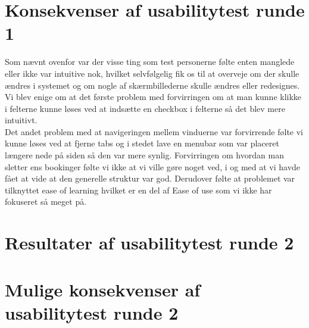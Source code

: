\section{Konsekvenser af usabilitytest runde 1}
Som nævnt ovenfor var der visse ting som test personerne følte enten manglede eller ikke var intuitive nok, hvilket selvfølgelig fik os til at overveje om der skulle ændres i systemet og om nogle af skærmbillederne skulle ændres eller redesignes. \\Vi blev enige om at det første problem med forvirringen om at man kunne klikke i felterne kunne løses ved at indsætte en checkbox i felterne så det blev mere intuitivt.\\ Det andet problem med at navigeringen mellem vinduerne var forvirrende følte vi kunne løses ved at fjerne tabs og i stedet lave en menubar som var placeret længere nede på siden så den var mere synlig. 
Forvirringen om hvordan man sletter ens bookinger følte vi ikke at vi ville gøre noget ved, i og med at vi havde fået at vide at den generelle struktur var god. Derudover følte at problemet var tilknyttet ease of learning hvilket er en del af Ease of use som vi ikke har fokuseret så meget på.
\section{Resultater af usabilitytest runde 2}
\section{Mulige konsekvenser af usabilitytest runde 2}